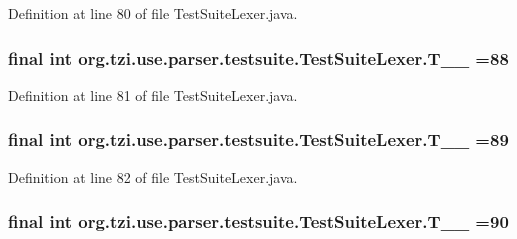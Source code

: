 Definition at line 80 of file Test\-Suite\-Lexer.\-java.

\hypertarget{classorg_1_1tzi_1_1use_1_1parser_1_1testsuite_1_1_test_suite_lexer_af15a8c10b8e3a6f7906c68ee7b2956b9}{
\subsubsection[{T\-\_\-\-\_\-88}]{\setlength{\rightskip}{0pt plus 5cm}final int org.\-tzi.\-use.\-parser.\-testsuite.\-Test\-Suite\-Lexer.\-T\-\_\-\-\_ =88\hspace{0.3cm}{\ttfamily [static]}}}\label{classorg_1_1tzi_1_1use_1_1parser_1_1testsuite_1_1_test_suite_lexer_af15a8c10b8e3a6f7906c68ee7b2956b9}


Definition at line 81 of file Test\-Suite\-Lexer.\-java.

\hypertarget{classorg_1_1tzi_1_1use_1_1parser_1_1testsuite_1_1_test_suite_lexer_aa471ba23598bbe2c6e6b916c2db4948e}{
\subsubsection[{T\-\_\-\-\_\-89}]{\setlength{\rightskip}{0pt plus 5cm}final int org.\-tzi.\-use.\-parser.\-testsuite.\-Test\-Suite\-Lexer.\-T\-\_\-\-\_ =89\hspace{0.3cm}{\ttfamily [static]}}}\label{classorg_1_1tzi_1_1use_1_1parser_1_1testsuite_1_1_test_suite_lexer_aa471ba23598bbe2c6e6b916c2db4948e}


Definition at line 82 of file Test\-Suite\-Lexer.\-java.

\hypertarget{classorg_1_1tzi_1_1use_1_1parser_1_1testsuite_1_1_test_suite_lexer_a4a63571bc16879a683a7dc5928e83fe3}{
\subsubsection[{T\-\_\-\-\_\-90}]{\setlength{\rightskip}{0pt plus 5cm}final int org.\-tzi.\-use.\-parser.\-testsuite.\-Test\-Suite\-Lexer.\-T\-\_\-\-\_ =90\hspace{0.3cm}{\ttfamily [static]}}}\label{classorg_1_1tzi_1_1use_1_1parser_1_1testsuite_1_1_test_suite_lexer_a4a63571bc16879a683a7dc5928e83fe3}


